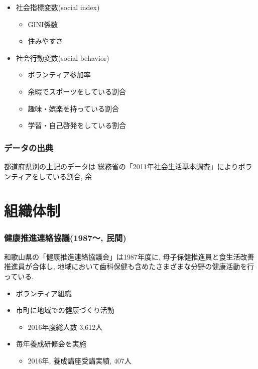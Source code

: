 \begin{itemize} \setlength{\itemsep}{-0.5mm} \setlength{\parskip}{-0.5mm}
	\item 社会指標変数(social index)
	      \begin{itemize} \setlength{\itemsep}{-0.5mm} \setlength{\parskip}{-0.5mm}
		      \item 	GINI係数
		      \item 	住みやすさ　%
	      \end{itemize}
	\item 社会行動変数(social behavior)
	      \begin{itemize} \setlength{\itemsep}{-0.5mm} \setlength{\parskip}{-0.5mm}
		      \item 	ボランティア参加率
		      \item 	余暇でスポーツをしている割合
		      \item 	趣味・娯楽を持っている割合
		      \item 	学習・自己啓発をしている割合
	      \end{itemize}
\end{itemize}

\subsection{データの出典}
都道府県別の上記のデータは
総務省の「2011年社会生活基本調査」によりボランティアをしている割合, 余



\chapter{組織体制}
\subsection{健康推進連絡協議(1987〜, 民間)}
和歌山県の「健康推進連絡協議会」は1987年度に, 母子保健推進員と食生活改善推進員が合体し, 地域において歯科保健も含めたさまざまな分野の健康活動を行っている.
\begin{itemize} \setlength{\itemsep}{-0.5mm} \setlength{\parskip}{-0.5mm}

	\item  ボランティア組織
	\item  市町に地域での健康づくり活動
	      \begin{itemize} \setlength{\itemsep}{-0.5mm} \setlength{\parskip}{-0.5mm}
		      \item 2016年度総人数 3,612人
	      \end{itemize}
	\item  毎年養成研修会を実施
	      \begin{itemize} \setlength{\itemsep}{-0.5mm} \setlength{\parskip}{-0.5mm}
		      \item 2016年, 養成講座受講実績, 407人
	      \end{itemize}
\end{itemize}


